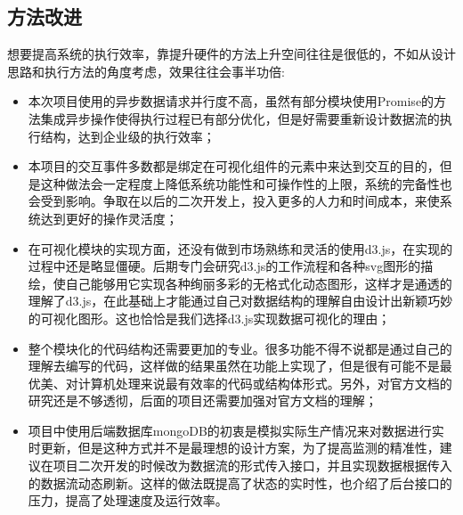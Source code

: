 \subsection{方法改进}
想要提高系统的执行效率，靠提升硬件的方法上升空间往往是很低的，不如从设计思路和执行方法的角度考虑，效果往往会事半功倍:
\begin{itemize}
	\item 本次项目使用的异步数据请求并行度不高，虽然有部分模块使用Promise的方法集成异步操作使得执行过程已有部分优化，但是好需要重新设计数据流的执行结构，达到企业级的执行效率；
	\item 本项目的交互事件多数都是绑定在可视化组件的元素中来达到交互的目的，但是这种做法会一定程度上降低系统功能性和可操作性的上限，系统的完备性也会受到影响。争取在以后的二次开发上，投入更多的人力和时间成本，来使系统达到更好的操作灵活度；
	\item 在可视化模块的实现方面，还没有做到市场熟练和灵活的使用d3.js，在实现的过程中还是略显僵硬。后期专门会研究d3.js的工作流程和各种svg图形的描绘，使自己能够用它实现各种绚丽多彩的无格式化动态图形，这样才是通透的理解了d3.js，在此基础上才能通过自己对数据结构的理解自由设计出新颖巧妙的可视化图形。这也恰恰是我们选择d3.js实现数据可视化的理由；
	\item 整个模块化的代码结构还需要更加的专业。很多功能不得不说都是通过自己的理解去编写的代码，这样做的结果虽然在功能上实现了，但是很有可能不是最优美、对计算机处理来说最有效率的代码或结构体形式。另外，对官方文档的研究还是不够透彻，后面的项目还需要加强对官方文档的理解；
	\item 项目中使用后端数据库mongoDB的初衷是模拟实际生产情况来对数据进行实时更新，但是这种方式并不是最理想的设计方案，为了提高监测的精准性，建议在项目二次开发的时候改为数据流的形式传入接口，并且实现数据根据传入的数据流动态刷新。这样的做法既提高了状态的实时性，也介绍了后台接口的压力，提高了处理速度及运行效率。
\end{itemize}